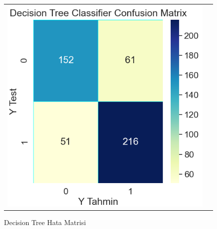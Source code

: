 \documentclass[conference]{IEEEtran}
\begin{document}
\begin{figure}[!h]
	\centering
	\begin{center}
		\begin{tabular}{cc}
			\includegraphics[scale=0.4]{pictures/pic_14.png}&
		\end{tabular}
	\end{center}
	\caption{Decision Tree Hata Matrisi}
	\label{fig:14}
\end{figure}
\end{document}
